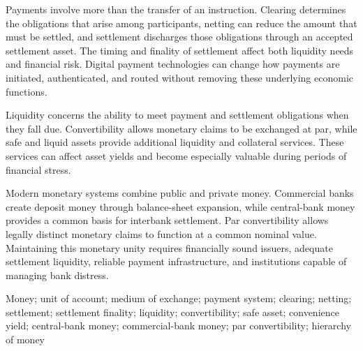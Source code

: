 Payments involve more than the transfer of an instruction. Clearing determines the obligations that arise among participants, netting can reduce the amount that must be settled, and settlement discharges those obligations through an accepted settlement asset. The timing and finality of settlement affect both liquidity needs and financial risk. Digital payment technologies can change how payments are initiated, authenticated, and routed without removing these underlying economic functions.

Liquidity concerns the ability to meet payment and settlement obligations when they fall due. Convertibility allows monetary claims to be exchanged at par, while safe and liquid assets provide additional liquidity and collateral services. These services can affect asset yields and become especially valuable during periods of financial stress.

Modern monetary systems combine public and private money. Commercial banks create deposit money through balance-sheet expansion, while central-bank money provides a common basis for interbank settlement. Par convertibility allows legally distinct monetary claims to function at a common nominal value. Maintaining this monetary unity requires financially sound issuers, adequate settlement liquidity, reliable payment infrastructure, and institutions capable of managing bank distress.



Money; unit of account; medium of exchange; payment system; clearing; netting; settlement; settlement finality; liquidity; convertibility; safe asset; convenience yield; central-bank money; commercial-bank money; par convertibility; hierarchy of money




